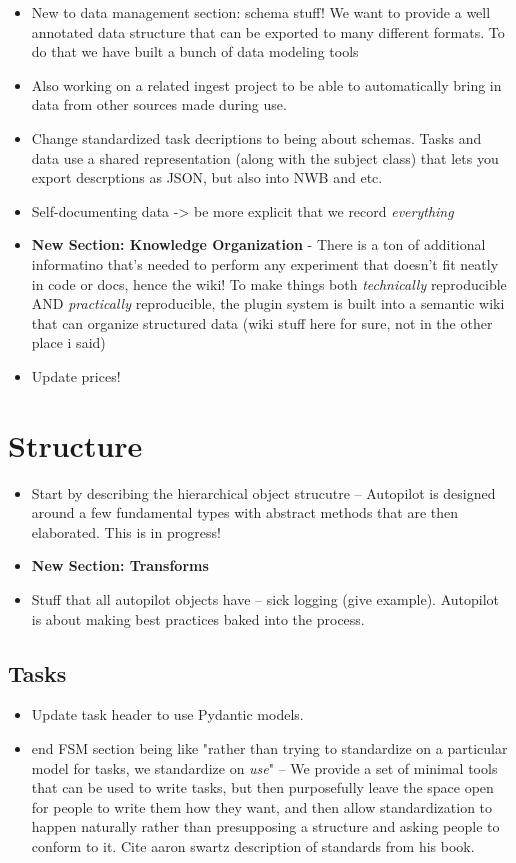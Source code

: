 \begin{itemize}
\item New to data management section: schema stuff! We want to provide a well annotated data structure that can be exported to many different formats. To do that we have built a bunch of data modeling tools
\item Also working on a related ingest project to be able to automatically bring in data from other sources made during use. 
\item Change standardized task decriptions to being about schemas. Tasks and data use a shared representation (along with the subject class) that lets you export descrptions as JSON, but also into NWB and etc.
\item Self-documenting data -> be more explicit that we record \textit{everything}
\item \textbf{New Section: Knowledge Organization} - There is a ton of additional informatino that's needed to perform any experiment that doesn't fit neatly in code or docs, hence the wiki! To make things both \textit{technically} reproducible AND \textit{practically} reproducible, the plugin system is built into a semantic wiki that can organize structured data (wiki stuff here for sure, not in the other place i said)
\item Update prices!
\end{itemize}

\section{Structure}

\begin{itemize}
\item Start by describing the hierarchical object strucutre -- Autopilot is designed around a few fundamental types with abstract methods that are then elaborated. This is in progress!
\item \textbf{New Section: Transforms}
\item Stuff that all autopilot objects have -- sick logging (give example). Autopilot is about making best practices baked into the process. 
\end{itemize}

\subsection{Tasks}

\begin{itemize}
\item Update task header to use Pydantic models.
\item end FSM section being like "rather than trying to standardize on a particular model for tasks, we standardize on \textit{use}" -- We provide a set of minimal tools that can be used to write tasks, but then purposefully leave the space open for people to write them how they want, and then allow standardization to happen naturally rather than presupposing a structure and asking people to conform to it. Cite aaron swartz description of standards from his book.
\end{itemize}


